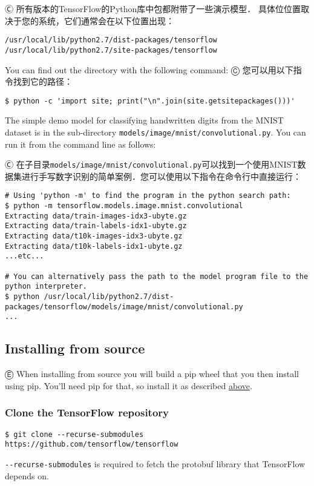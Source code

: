 Ⓒ 所有版本的TensorFlow的Python库中包都附带了一些演示模型． 具体位位置取决于您的系统，它们通常会在以下位置出现：

\begin{lstlisting}
/usr/local/lib/python2.7/dist-packages/tensorflow
/usr/local/lib/python2.7/site-packages/tensorflow
\end{lstlisting}

You can find out the directory with the following command:
Ⓒ 您可以用以下指令找到它的路径：

\begin{lstlisting}
$ python -c 'import site; print("\n".join(site.getsitepackages()))'
\end{lstlisting}

The simple demo model for classifying handwritten digits from the MNIST dataset is in the sub-directory \lstinline{models/image/mnist/convolutional.py}. You can run it from the command line as follows:

Ⓒ 在子目录\lstinline{models/image/mnist/convolutional.py}可以找到一个使用MNIST数据集进行手写数字识别的简单案例．您可以使用以下指令在命令行中直接运行：

\begin{lstlisting}
# Using 'python -m' to find the program in the python search path:
$ python -m tensorflow.models.image.mnist.convolutional
Extracting data/train-images-idx3-ubyte.gz
Extracting data/train-labels-idx1-ubyte.gz
Extracting data/t10k-images-idx3-ubyte.gz
Extracting data/t10k-labels-idx1-ubyte.gz
...etc...

# You can alternatively pass the path to the model program file to the python interpreter.
$ python /usr/local/lib/python2.7/dist-packages/tensorflow/models/image/mnist/convolutional.py
...
\end{lstlisting}


%
\subsection {Installing from source}

Ⓔ \textcolor{etc}{When installing from source you will build a pip wheel that you then install using pip. You'll need pip for that, so install it as described \hyperref[pip_install]{above}.}

\subsubsection {Clone the TensorFlow repository}
\begin{lstlisting}
$ git clone --recurse-submodules https://github.com/tensorflow/tensorflow
\end{lstlisting}
\lstinline{--recurse-submodules} is required to fetch the protobuf library that TensorFlow depends on.


